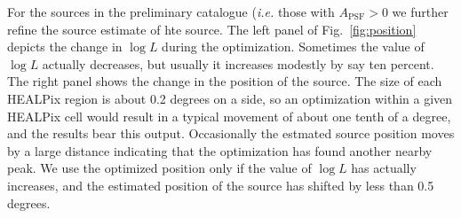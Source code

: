 \documentclass[useAMS,usenatbib]{mn2e}
\begin{document}
For the sources in the preliminary catalogue ({\em i.e.} those with
$A_\mathrm{PSF}>0$ we further refine the source estimate of hte
source.  The left panel of Fig.~\ref{fig:position} depicts the change
in $\log L$ during the optimization.  Sometimes the value of $\log L$
actually decreases, but usually it increases modestly by say ten
percent.  The right panel shows the change in the position of the
source.  The size of each HEALPix region is about 0.2 degrees on a
side, so an optimization within a given HEALPix cell would result in a
typical movement of about one tenth of a degree, and the results bear
this output.  Occasionally the estmated source position moves by a
large distance indicating that the optimization has found another
nearby peak.  We use the optimized position only if the value of $\log
L$ has actually increases, and the estimated position of the source
has shifted by less than 0.5 degrees.
\end{document}
